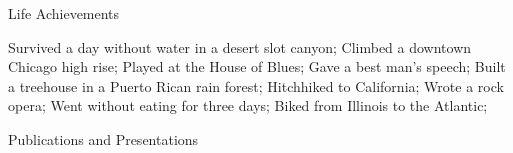 \documentclass{resume} %
\begin{document}
\begin{rSection}{Life Achievements}
	
	Survived a day without water in a desert slot canyon;
	Climbed a downtown Chicago high rise;
	Played at the House of Blues;
	Gave a best man's speech;
	Built a treehouse in a Puerto Rican rain forest;
	Hitchhiked to California;
	Wrote a rock opera;
	Went without eating for three days;
	Biked from Illinois to the Atlantic;
			
\end{rSection}


\begin{rSection}{Publications and Presentations}
	\nocite{*}
	

\end{rSection}
\end{document}
